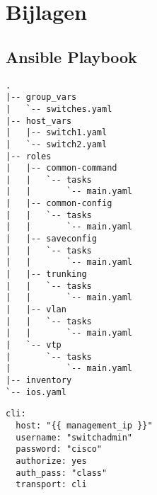

\chapter*{Bijlagen}
\label{ch:bijlagen}

\setcounter{section}{0}
\renewcommand\thesection{\Alph{section}}

\section{Ansible Playbook}
\label{ch:ansibleplaybookannex}

\begin{BVerbatim}
.
|-- group_vars
|   `-- switches.yaml
|-- host_vars
|   |-- switch1.yaml
|   `-- switch2.yaml
|-- roles
|   |-- common-command
|   |   `-- tasks
|   |       `-- main.yaml
|   |-- common-config
|   |   `-- tasks
|   |       `-- main.yaml
|   |-- saveconfig
|   |   `-- tasks
|   |       `-- main.yaml
|   |-- trunking
|   |   `-- tasks
|   |       `-- main.yaml
|   |-- vlan
|   |   `-- tasks
|   |       `-- main.yaml
|   `-- vtp
|       `-- tasks
|           `-- main.yaml
|-- inventory
`-- ios.yaml
\end{BVerbatim}

\begin{Verbatim}[frame=topline, framesep=4mm, label=\fbox{group\_vars/switches.yaml}]
cli:
  host: "{{ management_ip }}"
  username: "switchadmin"
  password: "cisco"
  authorize: yes
  auth_pass: "class"
  transport: cli
\end{Verbatim}

